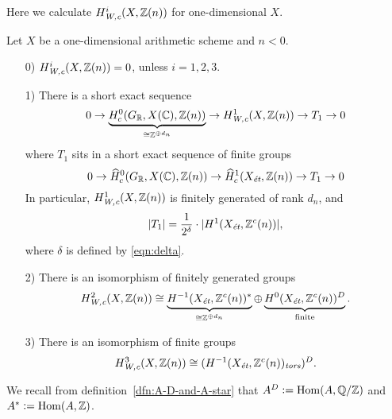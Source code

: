 \documentclass{article}
\numberwithin{equation}{section}
\begin{document}
Here we calculate $H^i_\Wc (X, \ZZ(n))$ for one-dimensional $X$.

\begin{proposition}
  \label{prop:calculation-of-H-Wc}
  Let $X$ be a one-dimensional arithmetic scheme and $n < 0$.

  \begin{enumerate}
  \item[0)] $H^i_\Wc (X, \ZZ(n)) = 0$, unless $i = 1,2,3$.

  \item[1)] There is a short exact sequence
    \begin{equation}
      \label{eqn:H1Wc-ses}
      0 \to \underbrace{H^0_c (G_\RR, X(\CC), \ZZ(n))}_{\cong \ZZ^{\oplus d_n}} \to
      H^1_\Wc (X, \ZZ(n)) \to T_1 \to 0
    \end{equation}
    where $T_1$ sits in a short exact sequence of finite groups
    \[ 0 \to \widehat{H}^0_c (G_\RR, X(\CC), \ZZ(n)) \to
      \widehat{H}^1_c (X_\et, \ZZ(n)) \to
      T_1 \to 0 \]
    In particular, $H^1_\Wc (X, \ZZ(n))$ is finitely generated of rank $d_n$,
    and
    $$|T_1| = \frac{1}{2^\delta}\cdot |H^1 (X_\et, \ZZ^c (n))|,$$
    where $\delta$ is defined by \eqref{eqn:delta}.

  \item[2)] There is an isomorphism of finitely generated groups
    \[ H^2_\Wc (X, \ZZ(n)) \cong
      \underbrace{H^{-1} (X_\et, \ZZ^c(n))^*}_{\cong \ZZ^{\oplus d_n}}
      \oplus
      \underbrace{H^0 (X_\et, \ZZ^c(n))^D}_{\text{finite}}. \]

  \item[3)] There is an isomorphism of finite groups
    $$H^3_\Wc (X, \ZZ(n)) \cong (H^{-1} (X_\et, \ZZ^c(n))_\tors)^D.$$
  \end{enumerate}
\end{proposition}

We recall from definition~\ref{dfn:A-D-and-A-star} that
$A^D \dfn \Hom (A, \QQ/\ZZ)$ and $A^* \dfn \Hom (A, \ZZ)$.
\end{document}
